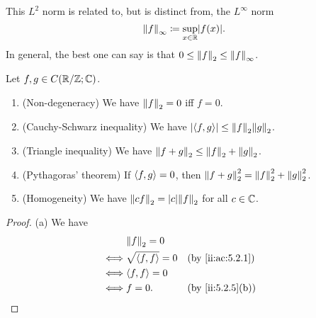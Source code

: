 \begin{note}
  This \(L^2\) norm is related to, but is distinct from, the \(L^\infty\) norm
  \[
    \norm*{f}_\infty \coloneqq \sup_{x \in \R} \abs{f(x)}.
  \]
  In general, the best one can say is that \(0 \leq \norm*{f}_2 \leq \norm*{f}_\infty\).
\end{note}

\setcounter{thm}{6}
\begin{lem}\label{ii:5.2.7}
  Let \(f, g \in C(\R / \Z ; \C)\).
  \begin{enumerate}
    \item (Non-degeneracy)
          We have \(\norm*{f}_2 = 0\) iff \(f = 0\).
    \item (Cauchy-Schwarz inequality)
          We have \(\abs{\inner*{f, g}} \leq \norm*{f}_2 \norm*{g}_2\).
    \item (Triangle inequality)
          We have \(\norm*{f + g}_2 \leq \norm*{f}_2 + \norm*{g}_2\).
    \item (Pythagoras' theorem)
          If \(\inner*{f, g} = 0\), then \(\norm*{f + g}_2^2 = \norm*{f}_2^2 + \norm*{g}_2^2\).
    \item (Homogeneity)
          We have \(\norm*{cf}_2 = \abs{c} \norm*{f}_2\) for all \(c \in \C\).
  \end{enumerate}
\end{lem}

\begin{proof}{(a)}
  We have
  \begin{align*}
         & \norm*{f}_2 = 0                                \\
    \iff & \sqrt{\inner*{f, f}} = 0 &  & \by{ii:ac:5.2.1} \\
    \iff & \inner*{f, f} = 0                              \\
    \iff & f = 0.                   &  & \by{ii:5.2.5}[b]
  \end{align*}
\end{proof}

